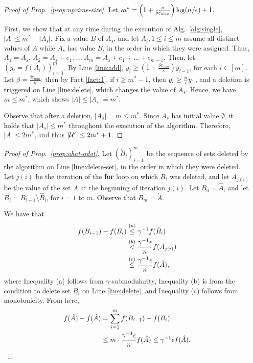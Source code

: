 \begin{proof}[Proof of Prop.~\ref{prop:uprime-size}]
  Let $m^* = \left( 1 + \frac{\kappa }{\delta c_{min} } \right) \log ( n / \epsilon ) + 1.$

  First, we show that at any time during the execution of Alg.~\ref{alg:single}, $|A| \le m^* + |A_s|$.
  Fix a value $B$ of $A_s$, and let $A_i, 1 \le i \le m$ assume all distinct values of $A$ while $A_s$
  has value $B$, in the order in which they were assigned. Thus, $A_1 = A_s$, $A_2 = A_s + e_1, \ldots, A_m = A_s + e_1 + \ldots + e_{m-1}$.
  Then, let $(y_i = f(A_i))_{i=1}^m$. By Line \ref{line:add}, $y_i \ge \left( 1 + \frac{\delta c_{min}}{\kappa } \right) y_{i-1}$, for each $i \in [m]$. Let $\beta = \frac{\delta c_{min}}{\kappa }$; then by Fact \ref{fact:1}, if $i \ge m^* - 1$, then $y_i \ge \frac{n}{\epsilon} y_1$, and a deletion is triggered on Line \ref{line:delete}, which changes the value of $A_s$. Hence, we have $m \le m^*$, which shows $|A| \le |A_s| = m^*$.

  Observe that after a deletion, $|A_s| = m \le m^*$. Since $A_s$ has initial value $\emptyset$, it holds that $|A_s| \le m^*$ throughout the execution of the algorithm. Therefore, $|A| \le 2m^*$, and thus $|\mathcal{U}'| \le 2m^* +1$.
\end{proof}

\begin{proof}[Proof of Prop.~\ref{prop:ahat-adot}]
  Let $( \dot B_i )_{i=1}^m$ be the sequence of sets deleted by the algorithm on
  Line \ref{line:delete-set}, in the order in which they were deleted.
  Let $j(i)$ be the iteration of the \textbf{for} loop on which $B_i$
  was deleted, and let $A_{j(i)}$ be the value of the set $A$ at the
  beginning of iteration $j(i)$. Let $B_0 = \hat A$, and let
  $B_i = B_{i-1} \setminus \hat B_i$, for $i = 1$ to $m$.
  Observe that $B_m = \dot A$.

  We have that
  \begin{align*}
    f( B_{i-1} ) - f(B_i) &\overset{(a)}{\le} \gamma^{-1} f( \dot B_i ) \\
                          &\overset{(b)}{<} \frac{\gamma^{-1}\epsilon}{n} f( A_{j(i)} ) \\
                          &\overset{(c)}{\le} \frac{\gamma^{-1}\epsilon}{n} f( \hat A ),
  \end{align*}
  where Inequality (a) follows from $\gamma$-submodularity,
  Inequality (b) is from the condition to delete set $\dot B_i$ on Line \ref{line:delete},
  and Inequality (c) follows from monotonicity.
  From here,
  \begin{align*}
    f( \hat A ) - f( \dot A ) &= \sum_{i=1}^m f( B_{i-1} ) - f( B_i ) \\
    &\le m \cdot \frac{\gamma^{-1}\epsilon}{n} f( \hat A ) \le \gamma^{-1}\epsilon f( \hat A ). \qedhere
  \end{align*}
\end{proof}

